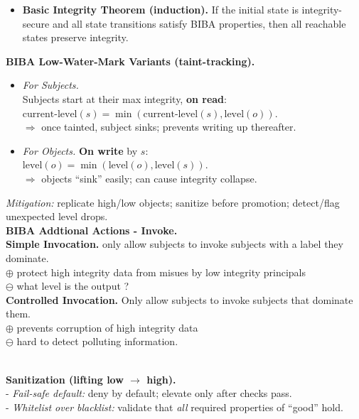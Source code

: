 \documentclass[9pt, a4paper]{extarticle}
\begin{document}
\begin{minipage}[t]{0.495\textwidth}
\begin{minipage}[t]{0.5\textwidth}
\begin{itemize}[itemsep=2pt]
			\item[]	\textbf{Basic Integrity Theorem (induction).} If the initial state is integrity-secure and all state transitions satisfy BIBA properties, then all reachable states preserve integrity.
		\end{itemize}
	\end{minipage}
	\begin{minipage}[t]{0.5\textwidth}
		\textbf{BIBA Low-Water-Mark Variants (taint-tracking).}
		\begin{itemize}[itemsep=1pt, leftmargin=10pt]
			\item[1.] \textit{For Subjects.}\\ Subjects start at their max integrity, \textbf{on read}:\\ $\text{current-level}(s) = \min(\text{current-level}(s), \text{level}(o))$.	\\$\Rightarrow$ once tainted, subject sinks; prevents writing up thereafter.
			\item[2.] \textit{For Objects.} \textbf{On write} by $s$:\\$\text{level}(o) = \min(\text{level}(o), \text{level}(s))$.\\
			      $\Rightarrow$ objects “sink” easily; can cause integrity collapse.
		\end{itemize}
		\textit{Mitigation:} replicate high/low objects; sanitize before promotion; detect/flag unexpected level drops.\\
		\textbf{BIBA Addtional Actions - Invoke.}\\
		\textbf{Simple Invocation.} only allow subjects to invoke subjects with a label they dominate.\\
		$\oplus$ protect high integrity data from misues by low integrity principals\\
		$\ominus$ what level is the output ?\\
		\textbf{Controlled Invocation.} Only allow subjects to invoke subjects that dominate them.\\
		$\oplus$ prevents corruption of high integrity data\\
		$\ominus$ hard to detect polluting information.
	\end{minipage}\\
	\textbf{Sanitization (lifting low $\rightarrow$ high).}\\
	- \textit{Fail-safe default:} deny by default; elevate only after checks pass.\\
	- \textit{Whitelist over blacklist:} validate that \emph{all} required properties of “good” hold.\\

\end{minipage}
\end{document}
